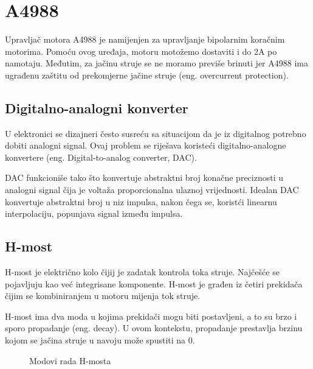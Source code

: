 \documentclass[../Document.tex]{subfiles}
\begin{document}
\section{A4988} \label{acdoo}
Upravljač motora A4988 je namijenjen za upravljanje bipolarnim koračnim motorima\cite{adriver}. Pomoću ovog uređaja, motoru motožemo dostaviti i do 2A po namotaju. Međutim, za jačinu struje se ne moramo previše brinuti jer A4988 ima ugrađenu zaštitu od prekomjerne jačine struje (eng. overcurrent protection).

\subsection{Digitalno-analogni konverter}
U elektronici se dizajneri često susreću sa situacijom da je iz digitalnog potrebno dobiti analogni signal. Ovaj problem se riješava koristeći digitalno-analogne konvertere (eng. Digital-to-analog converter, DAC)\cite{dac}.

DAC funkcioniše tako što konvertuje abstraktni broj konačne preciznosti u analogni signal čija je voltaža proporcionalna ulaznoj vrijednosti. Idealan DAC konvertuje abstraktni broj u niz impulsa, nakon čega se, koristći linearnu interpolaciju, popunjava signal između impulsa.

\subsection{H-most}
H-most je električno kolo čijij je zadatak kontrola toka struje. Najčešće se pojavljuju kao već integrisane komponente. H-most je građen iz četiri prekidača čijim se kombiniranjem u motoru mijenja tok struje.


H-most ima dva moda u kojima prekidači mogu biti postavljeni, a to su brzo i sporo propadanje (eng. decay). U ovom kontekstu, propadanje prestavlja brzinu kojom se jačina struje u navoju može spustiti na 0.

\begin{figure}
    \centering
    \qquad
    \caption{Modovi rada H-mosta}
\end{figure}
\end{document}
